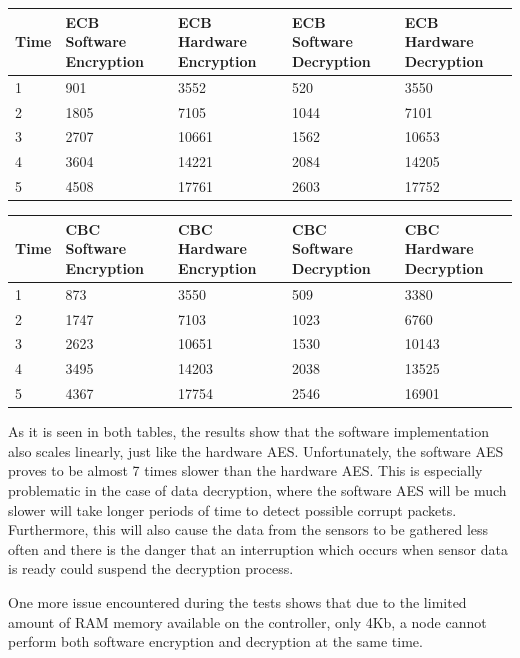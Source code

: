 \\
\\

\begin{tabular}{ | l | p{1.5cm} | p{1.5cm} | p{1.5cm} | p{1.5cm} |}
    \hline
    Time & ECB Software Encryption & ECB Hardware Encryption & ECB Software Decryption & ECB Hardware Decryption \\ \hline
    1 & 901 & 3552 & 520 & 3550 \\ \hline
    2 & 1805 & 7105 & 1044 & 7101 \\ \hline
    3 & 2707 & 10661 & 1562 & 10653\\ \hline
    4 & 3604 & 14221 & 2084 & 14205\\ \hline
    5 & 4508 & 17761 & 2603 & 17752\\ \hline
\end{tabular}


\begin{tabular}{ | l | p{1.5cm} | p{1.5cm} | p{1.5cm} | p{1.5cm} |}
    \hline
    Time & CBC Software Encryption & CBC Hardware Encryption & CBC Software Decryption & CBC Hardware Decryption \\ \hline
    1 & 873 & 3550 & 509 & 3380 \\ \hline
    2 & 1747 & 7103 & 1023 & 6760 \\ \hline
    3 & 2623 & 10651 & 1530 & 10143 \\ \hline
    4 & 3495 & 14203 & 2038 & 13525 \\ \hline
    5 & 4367 & 17754 & 2546 & 16901\\ \hline
\end{tabular}

As it is seen in both tables, the results show that the software implementation also 
scales linearly, just like the hardware AES. Unfortunately, the software AES proves to 
be almost 7 times slower than the hardware AES. This is especially problematic in the 
case of data decryption, where the software AES will be much slower will take longer 
periods of time to detect possible corrupt packets. Furthermore, this will also cause 
the data from the sensors to be gathered less often and there is the danger that 
an interruption which occurs when sensor data is ready could suspend the decryption 
process.

One more issue encountered during the tests shows that due to the limited amount of 
RAM memory available on the controller, only 4Kb, a node cannot perform both software 
encryption and decryption at the same time.

